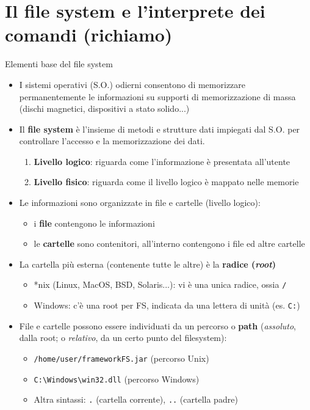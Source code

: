 \documentclass[xcolor=dvipsnames,presentation]{beamer}
\begin{document}

\section{Il file system e l'interprete dei comandi (richiamo)}

\begin{frame}{Elementi base del file system}
  \begin{itemize}
    \item I sistemi operativi (S.O.) odierni consentono di memorizzare permanentemente le informazioni su
supporti di memorizzazione di massa (dischi magnetici, dispositivi a stato solido...)
	\item Il \textbf{file system} è l'insieme di metodi e   strutture dati impiegati dal S.O. per controllare
l’accesso e la memorizzazione dei dati.
	\begin{enumerate}
	\item \textbf{Livello logico}: riguarda come l'informazione è presentata all'utente
	\item \textbf{Livello fisico}: riguarda come il livello logico è mappato nelle memorie
	\end{enumerate}
    \item Le informazioni sono organizzate in file e cartelle (livello logico):
      \begin{itemize}
        \item i \textbf{file} contengono le informazioni
        \item le \textbf{cartelle} sono contenitori, all'interno contengono i file ed altre cartelle
      \end{itemize}
    \item La cartella più esterna (contenente tutte le altre) è la \textbf{radice (\emph{root})} %
      \begin{itemize}
        \item *nix (Linux, MacOS, BSD, Solaris...): vi è una unica radice, ossia \texttt{/}
        \item Windows: c'è una root per FS, indicata da una lettera di unità (es.
\texttt{C:}) %
      \end{itemize}
    \item File e cartelle possono essere individuati da un percorso o \textbf{path} (\emph{assoluto}, dalla root; o \emph{relativo}, da un certo punto del filesystem):
    \begin{itemize}
        \item \texttt{/home/user/frameworkFS.jar} (percorso Unix)
        \item \texttt{C:\textbackslash{}Windows\textbackslash{}win32.dll} (percorso Windows)
        \item Altra sintassi: \texttt{.} (cartella corrente), \texttt{..} (cartella padre)
    \end{itemize}
  \end{itemize}
\end{frame}
\end{document}
